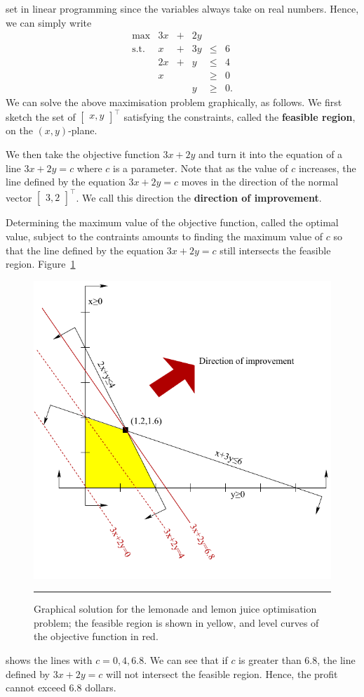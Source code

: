set in linear programming since the variables always take on real
numbers. Hence, we can simply write \[\begin{array}{rrcrll}
\max & 3x & + & 2y & \\
\mbox{s.t.}
& x & + & 3y & \leq & 6 \\
& 2x & +&  y & \leq & 4 \\
& x &  & & \geq & 0 \\
& & & y & \geq & 0.
\end{array}\]
\newpage\noindent We can solve the above maximisation problem graphically, as follows. We
first sketch the set of \(\begin{bmatrix} x, y\end{bmatrix}^{\!\top}\)
satisfying the constraints, called the \textbf{feasible region}, on the
\((x,y)\)-plane. \par We then take the objective function \(3x+2y\) and turn
it into the equation of a line \(3x+2y = c\) where \(c\) is a parameter.
Note that as the value of \(c\) increases, the line defined by the
equation \(3x+2y=c\) moves in the direction of the normal vector
\(\begin{bmatrix} 3,2\end{bmatrix}^{\!\top}\). We call this direction the
\textbf{direction of improvement}. \par Determining the maximum value of the objective
function, called the optimal value, subject to the contraints amounts to
finding the maximum value of \(c\) so that the line defined by the
equation \(3x+2y=c\) still intersects the feasible region. \newl Figure~\ref{fig:lemon}
\begin{figure}[!t]
\centering \includegraphics[width=0.7\linewidth]{images/OPT/lemon} 
\caption[\small Graphical solution for the lemonade and lemon juice problem]{\small Graphical solution for the lemonade and lemon juice optimisation problem; the feasible region is shown in yellow, and level curves of the objective function in red. }\hrule \label{fig:lemon}
\end{figure}
shows the lines with \(c=0,4,6.8\). We can see that
if \(c\) is greater than 6.8, the line defined by \(3x+2y = c\) will not
intersect the feasible region. Hence, the profit cannot exceed 6.8
dollars.


